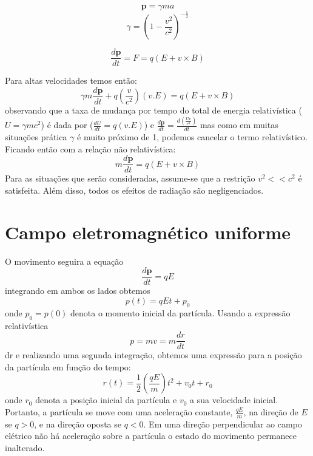 \documentclass[12pt,oneside,a4paper]{abntex2}
\begin{document}
\begin{equation}
 \bm{p} = \gamma ma
\end{equation}
\begin{equation}
 \gamma = {(1-\frac{v^2}{c^2})}^{-\frac{1}{2}}
 \end{equation} 

\begin{equation}
\frac{d\bm{p}}{dt}=F=q(E + v \times B)
\end{equation}

Para altas velocidades temos então:
\begin{equation}
\gamma m \frac{d\bm{p}}{dt} + q(\frac{v}{c^2})(v.E)= q(E + v \times B)
\end{equation}
observando que a taxa de mudança por tempo do total de energia relativística ($U=\gamma m c^2$) é dada por ($\frac{dU}{dt}=q(v.E)$) e $\frac{d\bm{p}}{dt}=\frac{d(\frac{Uv}{c^2})}{dt}$ mas como em muitas situações prática $\gamma$ é muito próximo de 1, podemos cancelar o termo relativístico. Ficando então com a relação não relativística:
\begin{equation}
m \frac{d\bm{p}}{dt}= q(E + v \times B)
\end{equation}
Para as situações que serão consideradas, assume-se que a restrição $v^2 << c^2$ é satisfeita. Além disso, todos os efeitos de radiação são negligenciados.

\section{Campo eletromagnético uniforme}
\noindent O movimento seguira a equação
\begin{equation}
\frac{d\bm{p}}{dt}= q E
\end{equation}
integrando em ambos os lados obtemos
\begin{equation}
p(t) = q E t + p_0
\end{equation}
onde $p_0=p(0)$ denota o momento inicial da partícula.
Usando a expressão relativística
\begin{equation}
p = m v = m \frac{dr}{dt}
\end{equation}dr
e realizando uma segunda integração, obtemos uma expressão para a posição da partícula em função do tempo: 
\begin{equation}
r(t) = \frac{1}{2}(\frac{qE}{m})t^2+v_0t+r_0  
\end{equation}
onde $r_0$ denota a posição inicial da partícula e $v_0$ a sua velocidade inicial.
Portanto, a partícula se move com uma aceleração constante, $\frac{qE}{m}$, na direção de $E$ se $q> 0$, e na direção oposta se $q <0$. Em uma direção perpendicular ao campo elétrico não há aceleração sobre a partícula o estado do movimento permanece inalterado.
\end{document}
